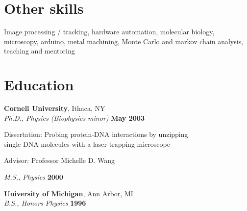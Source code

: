 \documentclass[margin,line]{resume}
\begin{document}
\begin{resume}
    \section{\mysidestyle Other skills} 

    Image processing / tracking, hardware automation, molecular biology, microscopy, arduino, metal machining, Monte Carlo and markov chain analysis, teaching and mentoring  
 
 
    \section{\mysidestyle Education}

    \textbf{Cornell University}, Ithaca, NY \vspace{2mm}\\\vspace{1mm}%
    \textsl{Ph.D., Physics (Biophysics minor)} \hfill \textbf{ May 2003}\vspace{-3mm}\\\vspace{-1mm}%
    \begin{list2}
        \item Dissertation: Probing protein-DNA interactions by unzipping \\
        single DNA molecules with a laser trapping microscope
        \item Advisor:  Professor Michelle D. Wang
    \end{list2}\vspace{-1.5mm}

    \textsl{M.S., Physics} \hfill \textbf{2000}\\\vspace{0mm}%

    \textbf{University of Michigan}, Ann Arbor, MI \vspace{2mm}\\\vspace{1mm}%
    \textsl{B.S., Honors Physics} \hfill \textbf{1996}\vspace{-3mm}\\\vspace{-1mm}%
    

\end{resume}
\end{document}
